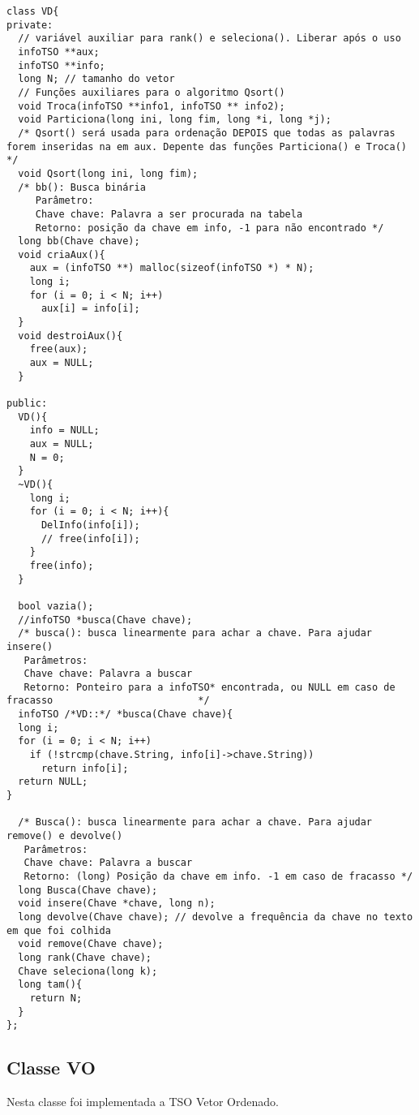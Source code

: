 \documentclass[a4paper]{article}
\begin{document}
\begin{verbatim}
class VD{
private:
  // variável auxiliar para rank() e seleciona(). Liberar após o uso
  infoTSO **aux;
  infoTSO **info;
  long N; // tamanho do vetor
  // Funções auxiliares para o algoritmo Qsort()
  void Troca(infoTSO **info1, infoTSO ** info2);
  void Particiona(long ini, long fim, long *i, long *j);
  /* Qsort() será usada para ordenação DEPOIS que todas as palavras forem inseridas na em aux. Depente das funções Particiona() e Troca() */
  void Qsort(long ini, long fim);
  /* bb(): Busca binária
     Parâmetro:
     Chave chave: Palavra a ser procurada na tabela
     Retorno: posição da chave em info, -1 para não encontrado */
  long bb(Chave chave);
  void criaAux(){
    aux = (infoTSO **) malloc(sizeof(infoTSO *) * N);
    long i;
    for (i = 0; i < N; i++)
      aux[i] = info[i];
  }
  void destroiAux(){
    free(aux);
    aux = NULL;
  }
  
public:
  VD(){
    info = NULL;
    aux = NULL;
    N = 0;
  }
  ~VD(){
    long i;
    for (i = 0; i < N; i++){
      DelInfo(info[i]);
      // free(info[i]);
    }
    free(info);
  }
  
  bool vazia();
  //infoTSO *busca(Chave chave);
  /* busca(): busca linearmente para achar a chave. Para ajudar insere()
   Parâmetros:
   Chave chave: Palavra a buscar
   Retorno: Ponteiro para a infoTSO* encontrada, ou NULL em caso de fracasso                         */
  infoTSO /*VD::*/ *busca(Chave chave){
  long i;
  for (i = 0; i < N; i++)
    if (!strcmp(chave.String, info[i]->chave.String))
      return info[i];
  return NULL;
}
  
  /* Busca(): busca linearmente para achar a chave. Para ajudar remove() e devolve()
   Parâmetros:
   Chave chave: Palavra a buscar
   Retorno: (long) Posição da chave em info. -1 em caso de fracasso */
  long Busca(Chave chave);
  void insere(Chave *chave, long n);
  long devolve(Chave chave); // devolve a frequência da chave no texto em que foi colhida
  void remove(Chave chave);
  long rank(Chave chave);
  Chave seleciona(long k);
  long tam(){
    return N;
  }
};
\end{verbatim}

\subsection{Classe VO}
\label{sec:classe-vo}

Nesta classe foi implementada a TSO Vetor Ordenado.
\end{document}
